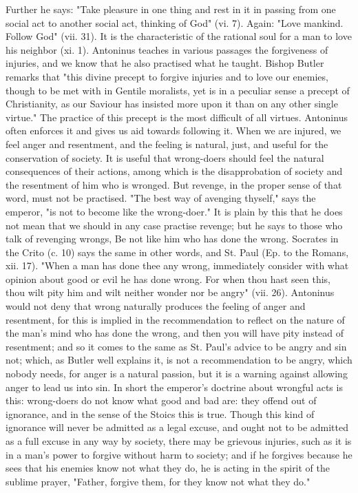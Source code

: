 Further he says: "Take pleasure in one thing and rest in it in passing from one social act to another social act, thinking of God" (vi. 7). Again: "Love mankind. Follow God" (vii. 31). It is the characteristic of the rational soul for a man to love his neighbor (xi. 1). Antoninus teaches in various passages the forgiveness of injuries, and we know that he also practised what he taught. Bishop Butler remarks that "this divine precept to forgive injuries and to love our enemies, though to be met with in Gentile moralists, yet is in a peculiar sense a precept of Christianity, as our Saviour has insisted more upon it than on any other single virtue." The practice of this precept is the most difficult of all virtues. Antoninus often enforces it and gives us aid towards following it. When we are injured, we feel anger and resentment, and the feeling is natural, just, and useful for the conservation of society. It is useful that wrong-doers should feel the natural consequences of their actions, among which is the disapprobation of society and the resentment of him who is wronged. But revenge, in the proper sense of that word, must not be practised. "The best way of avenging thyself," says the emperor, "is not to become like the wrong-doer." It is plain by this that he does not mean that we should in any case practise revenge; but he says to those who talk of revenging wrongs, Be not like him who has done the wrong. Socrates in the Crito (c. 10) says the same in other words, and St. Paul (Ep. to the Romans, xii. 17). "When a man has done thee any wrong, immediately consider with what opinion about good or evil he has done wrong. For when thou hast seen this, thou wilt pity him and wilt neither wonder nor be angry" (vii. 26). Antoninus would not deny that wrong naturally produces the feeling of anger and resentment, for this is implied in the recommendation to reflect on the nature of the man's mind who has done the wrong, and then you will have pity instead of resentment; and so it comes to the same as St. Paul's advice to be angry and sin not; which, as Butler well explains it, is not a recommendation to be angry, which nobody needs, for anger is a natural passion, but it is a warning against allowing anger to lead us into sin. In short the emperor's doctrine about wrongful acts is this: wrong-doers do not know what good and bad are: they offend out of ignorance, and in the sense of the Stoics this is true. Though this kind of ignorance will never be admitted as a legal excuse, and ought not to be admitted as a full excuse in any way by society, there may be grievous injuries, such as it is in a man's power to forgive without harm to society; and if he forgives because he sees that his enemies know not what they do, he is acting in the spirit of the sublime prayer, "Father, forgive them, for they know not what they do."

